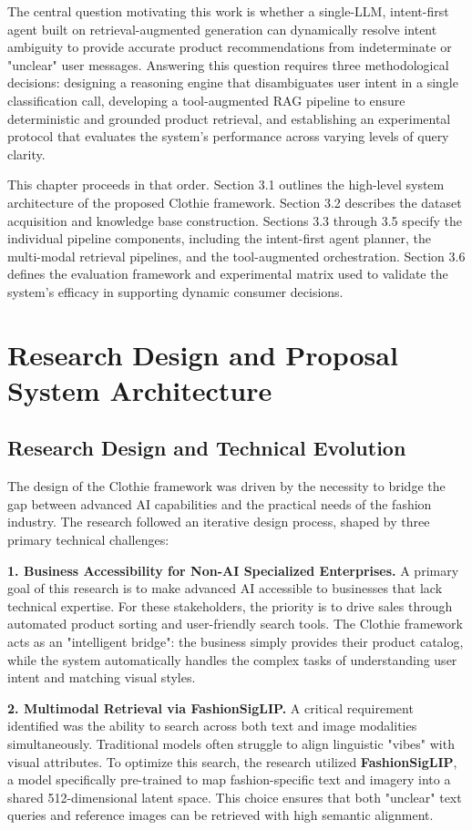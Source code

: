 The central question motivating this work is whether a single-LLM, intent-first agent built on retrieval-augmented generation can dynamically resolve intent ambiguity to provide accurate product recommendations from indeterminate or "unclear" user messages. Answering this question requires three methodological decisions: designing a reasoning engine that disambiguates user intent in a single classification call, developing a tool-augmented RAG pipeline to ensure deterministic and grounded product retrieval, and establishing an experimental protocol that evaluates the system’s performance across varying levels of query clarity.

This chapter proceeds in that order. Section 3.1 outlines the high-level system architecture of the proposed Clothie framework. Section 3.2 describes the dataset acquisition and knowledge base construction. Sections 3.3 through 3.5 specify the individual pipeline components, including the intent-first agent planner, the multi-modal retrieval pipelines, and the tool-augmented orchestration. Section 3.6 defines the evaluation framework and experimental matrix used to validate the system’s efficacy in supporting dynamic consumer decisions.

\section{Research Design and Proposal System Architecture}
\subsection{Research Design and Technical Evolution}
The design of the Clothie framework was driven by the necessity to bridge the gap between advanced AI capabilities and the practical needs of the fashion industry. The research followed an iterative design process, shaped by three primary technical challenges:

\textbf{1. Business Accessibility for Non-AI Specialized Enterprises.} A primary goal of this research is to make advanced AI accessible to businesses that lack technical expertise. For these stakeholders, the priority is to drive sales through automated product sorting and user-friendly search tools. The Clothie framework acts as an "intelligent bridge": the business simply provides their product catalog, while the system automatically handles the complex tasks of understanding user intent and matching visual styles.

\textbf{2. Multimodal Retrieval via FashionSigLIP.} A critical requirement identified was the ability to search across both text and image modalities simultaneously. Traditional models often struggle to align linguistic "vibes" with visual attributes. To optimize this search, the research utilized \textbf{FashionSigLIP}, a model specifically pre-trained to map fashion-specific text and imagery into a shared 512-dimensional latent space. This choice ensures that both "unclear" text queries and reference images can be retrieved with high semantic alignment.

